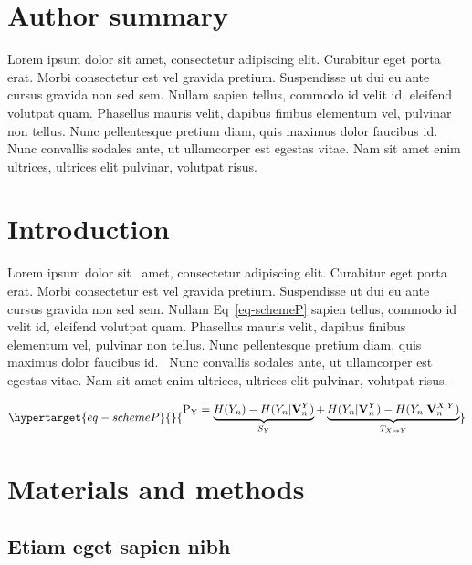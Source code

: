 \documentclass[
  10pt,
  letterpaper,
]{article}
\begin{document}
\section*{Author summary}
Lorem ipsum dolor sit amet, consectetur adipiscing elit. Curabitur eget
porta erat. Morbi consectetur est vel gravida pretium. Suspendisse ut
dui eu ante cursus gravida non sed sem. Nullam sapien tellus, commodo id
velit id, eleifend volutpat quam. Phasellus mauris velit, dapibus
finibus elementum vel, pulvinar non tellus. Nunc pellentesque pretium
diam, quis maximus dolor faucibus id. Nunc convallis sodales ante, ut
ullamcorper est egestas vitae. Nam sit amet enim ultrices, ultrices elit
pulvinar, volutpat risus.

\linenumbers\hypertarget{introduction}{%
\section{Introduction}\label{introduction}}

Lorem ipsum dolor sit~\citep{bib1} amet, consectetur adipiscing elit.
Curabitur eget porta erat. Morbi consectetur est vel gravida pretium.
Suspendisse ut dui eu ante cursus gravida non sed sem. Nullam
Eq~\ref{eq-schemeP} sapien tellus, commodo id velit id, eleifend
volutpat quam. Phasellus mauris velit, dapibus finibus elementum vel,
pulvinar non tellus. Nunc pellentesque pretium diam, quis maximus dolor
faucibus id.~\citep{bib2} Nunc convallis sodales ante, ut ullamcorper
est egestas vitae. Nam sit amet enim ultrices, ultrices elit pulvinar,
volutpat risus.

\begin{equation}\protect\hypertarget{eq-schemeP}{}{
\begin{aligned}
\mathrm{P_Y} = \underbrace{H(Y_n) - H(Y_n|\mathbf{V}^{Y}_{n})}_{S_Y} + \underbrace{H(Y_n|\mathbf{V}^{Y}_{n})- H(Y_n|\mathbf{V}^{X,Y}_{n})}_{T_{X\rightarrow Y}}
\end{aligned}
}\label{eq-schemeP}\end{equation}

\hypertarget{materials-and-methods}{%
\section{Materials and methods}\label{materials-and-methods}}

\hypertarget{etiam-eget-sapien-nibh}{%
\subsection{Etiam eget sapien nibh}\label{etiam-eget-sapien-nibh}}
\end{document}
